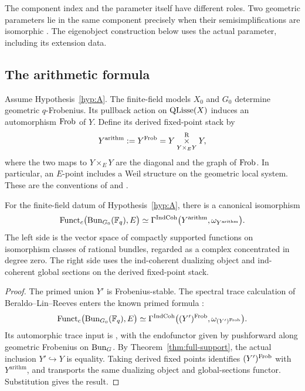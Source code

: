 The component index and the parameter itself have different roles.
Two geometric parameters lie in the same component precisely when their
semisimplifications are isomorphic
\cite[Proposition~3.7.2]{AGKRRV}.
The eigenobject construction below uses the actual parameter, including
its extension data.

\subsection{The arithmetic formula}

Assume Hypothesis~\ref{hyp:A}.  The finite-field models \(X_0\) and
\(G_0\) determine geometric \(q\)-Frobenius.  Its pullback action on
\(\operatorname{QLisse}(X)\) induces an automorphism \(\operatorname{Frob}\) of \(Y\).
Define its derived fixed-point stack by
\[
 Y^{\mathrm{arithm}}:=Y^{\operatorname{Frob}}
   =Y\underset{Y\times_EY}{\overset{\mathrm R}\times}Y,
\]
where the two maps to \(Y\times_EY\) are the diagonal and the graph of
\(\operatorname{Frob}\).  In particular, an \(E\)-point includes a Weil structure on
the geometric local system.  These are the conventions of
\cite[\S24.1]{AGKRRV} and \cite[\S1.5.1]{GR}.

\begin{corollary}\label{cor:arithmetic}
For the finite-field datum of Hypothesis~\ref{hyp:A}, there is a canonical
isomorphism
\[
 \operatorname{Funct}_c\bigl(\operatorname{Bun}_{G_0}(\mathbb F_q),E\bigr)
 \simeq
 \Gamma^{\operatorname{IndCoh}}\bigl(Y^{\mathrm{arithm}},
                         \omega_{Y^{\mathrm{arithm}}}\bigr).
\]
The left side is the vector space of compactly supported functions on
isomorphism classes of rational bundles, regarded as a complex concentrated
in degree zero.  The right side uses the ind-coherent dualizing object
and ind-coherent global sections on the derived fixed-point stack.
\end{corollary}
\begin{proof}
The primed union \(Y'\) is Frobenius-stable. The spectral trace
calculation of Beraldo--Lin--Reeves
\cite[\S\S6.4.12--6.4.13]{BeraldoLinReeves} enters the known primed
formula \cite[\S\S1.5.3--1.5.5 and Corollary~1.5.6]{GR}:
\[
 \operatorname{Funct}_c\bigl(\operatorname{Bun}_{G_0}(\mathbb F_q),E\bigr)
 \simeq
 \Gamma^{\operatorname{IndCoh}}\bigl((Y')^{\operatorname{Frob}},
                              \omega_{(Y')^{\operatorname{Frob}}}\bigr).
\]
Its automorphic trace input is
\cite[Theorem~0.2.6]{AGKRRVTrace}, with the endofunctor given by
pushforward along geometric Frobenius on \(\operatorname{Bun}_G\).
By Theorem~\ref{thm:full-support}, the actual inclusion \(Y'\hookrightarrow
Y\) is equality.  Taking derived fixed points identifies
\((Y')^{\operatorname{Frob}}\) with \(Y^{\mathrm{arithm}}\), and transports the
same dualizing object and global-sections functor.  Substitution gives
the result.
\end{proof}


